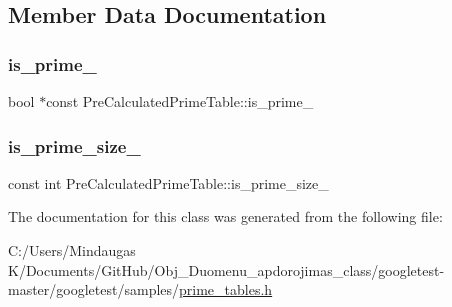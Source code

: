 \subsection{Member Data Documentation}
\mbox{\label{class_pre_calculated_prime_table_a66a8e1b3f58e76e620c1a8da32742aa9}} 
\subsubsection{\texorpdfstring{is\_prime\_}{is\_prime\_}}
{\footnotesize\ttfamily bool $\ast$const Pre\+Calculated\+Prime\+Table\+::is\+\_\+prime\+\_\+\hspace{0.3cm}{\ttfamily [private]}}

\mbox{\label{class_pre_calculated_prime_table_ad4275df41c5e5be3cad8c5abeaad1ac6}} 
\subsubsection{\texorpdfstring{is\_prime\_size\_}{is\_prime\_size\_}}
{\footnotesize\ttfamily const int Pre\+Calculated\+Prime\+Table\+::is\+\_\+prime\+\_\+size\+\_\+\hspace{0.3cm}{\ttfamily [private]}}



The documentation for this class was generated from the following file\+:\begin{DoxyCompactItemize}
\item 
C\+:/\+Users/\+Mindaugas K/\+Documents/\+Git\+Hub/\+Obj\+\_\+\+Duomenu\+\_\+apdorojimas\+\_\+class/googletest-\/master/googletest/samples/\mbox{\hyperlink{googletest-master_2googletest_2samples_2prime__tables_8h}{prime\+\_\+tables.\+h}}\end{DoxyCompactItemize}
